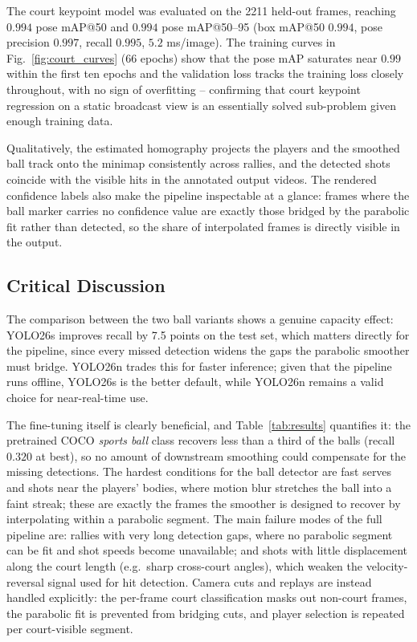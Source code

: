 \documentclass[10pt,twocolumn,a4paper]{article}
\begin{document}
	The court keypoint model was evaluated on the 2211 held-out frames, reaching $0.994$ pose mAP@50 and $0.994$ pose mAP@50--95 (box mAP@50 $0.994$, pose precision $0.997$, recall $0.995$, $5.2$ ms/image). The training curves in Fig.~\ref{fig:court_curves} (66 epochs) show that the pose mAP saturates near $0.99$ within the first ten epochs and the validation loss tracks the training loss closely throughout, with no sign of overfitting -- confirming that court keypoint regression on a static broadcast view is an essentially solved sub-problem given enough training data.

	Qualitatively, the estimated homography projects the players and the smoothed ball track onto the minimap consistently across rallies, and the detected shots coincide with the visible hits in the annotated output videos. The rendered confidence labels also make the pipeline inspectable at a glance: frames where the ball marker carries no confidence value are exactly those bridged by the parabolic fit rather than detected, so the share of interpolated frames is directly visible in the output.

	\subsection{Critical Discussion}

	The comparison between the two ball variants shows a genuine capacity effect: YOLO26s improves recall by 7.5 points on the test set, which matters directly for the pipeline, since every missed detection widens the gaps the parabolic smoother must bridge. YOLO26n trades this for faster inference; given that the pipeline runs offline, YOLO26s is the better default, while YOLO26n remains a valid choice for near-real-time use.

	The fine-tuning itself is clearly beneficial, and Table~\ref{tab:results} quantifies it: the pretrained COCO \emph{sports ball} class recovers less than a third of the balls (recall $0.320$ at best), so no amount of downstream smoothing could compensate for the missing detections. The hardest conditions for the ball detector are fast serves and shots near the players' bodies, where motion blur stretches the ball into a faint streak; these are exactly the frames the smoother is designed to recover by interpolating within a parabolic segment. The main failure modes of the full pipeline are: rallies with very long detection gaps, where no parabolic segment can be fit and shot speeds become unavailable; and shots with little displacement along the court length (e.g.\ sharp cross-court angles), which weaken the velocity-reversal signal used for hit detection. Camera cuts and replays are instead handled explicitly: the per-frame court classification masks out non-court frames, the parabolic fit is prevented from bridging cuts, and player selection is repeated per court-visible segment.
\end{document}
